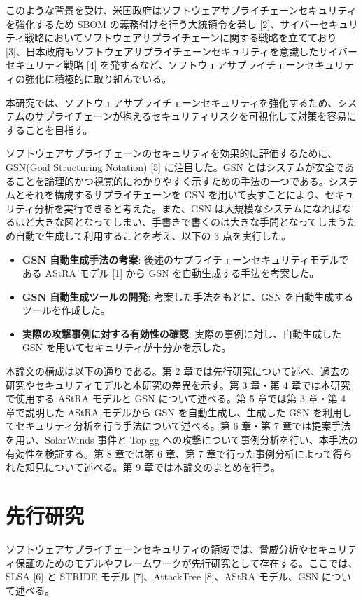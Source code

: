 \documentclass[paper]{ieicej} %
\begin{document}
このような背景を受け、米国政府はソフトウェアサプライチェーンセキュリティを強化するため SBOM の義務付けを行う大統領令を発し [2]、サイバーセキュリティ戦略においてソフトウェアサプライチェーンに関する戦略を立てており [3]、日本政府もソフトウェアサプライチェーンセキュリティを意識したサイバーセキュリティ戦略 [4] を発するなど、ソフトウェアサプライチェーンセキュリティの強化に積極的に取り組んでいる。

本研究では、ソフトウェアサプライチェーンセキュリティを強化するため、システムのサプライチェーンが抱えるセキュリティリスクを可視化して対策を容易にすることを目指す。

ソフトウェアサプライチェーンのセキュリティを効果的に評価するために、GSN(Goal Structuring Notation) [5] に注目した。GSN とはシステムが安全であることを論理的かつ視覚的にわかりやすく示すための手法の一つである。システムとそれを構成するサプライチェーンを GSN を用いて表すことにより、セキュリティ分析を実行できると考えた。また、GSN は大規模なシステムになればなるほど大きな図となってしまい、手書きで書くのは大きな手間となってしまうため自動で生成して利用することを考え、以下の 3 点を実行した。

\begin{itemize}
    \item \textbf{GSN 自動生成手法の考案}: 後述のサプライチェーンセキュリティモデルである AStRA モデル [1] から GSN を自動生成する手法を考案した。
    \item \textbf{GSN 自動生成ツールの開発}: 考案した手法をもとに、GSN を自動生成するツールを作成した。
    \item \textbf{実際の攻撃事例に対する有効性の確認}: 実際の事例に対し、自動生成した GSN を用いてセキュリティが十分かを示した。
\end{itemize}

本論文の構成は以下の通りである。第 2 章では先行研究について述べ、過去の研究やセキュリティモデルと本研究の差異を示す。第 3 章・第 4 章では本研究で使用する AStRA モデルと GSN について述べる。第 5 章では第 3 章・第 4 章で説明した AStRA モデルから GSN を自動生成し、生成した GSN を利用してセキュリティ分析を行う手法について述べる。第 6 章・第 7 章では提案手法を用い、SolarWinds 事件と Top.gg への攻撃について事例分析を行い、本手法の有効性を検証する。第 8 章では第 6 章、第 7 章で行った事例分析によって得られた知見について述べる。第 9 章では本論文のまとめを行う。

\section{先行研究}
ソフトウェアサプライチェーンセキュリティの領域では、脅威分析やセキュリティ保証のためのモデルやフレームワークが先行研究として存在する。ここでは、SLSA [6] と STRIDE モデル [7]、AttackTree [8]、AStRA モデル、GSN について述べる。
\end{document}
